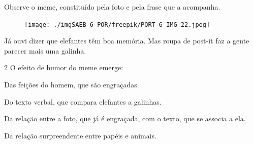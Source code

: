 


Observe o meme, constituído pela foto e pela frase que a
acompanha.\enlargethispage{2\baselineskip}

\begin{myquote}
\begin{figure}[H]
\centering\texttt{[image: ./imgSAEB\_6\_POR/freepik/PORT\_6\_IMG-22.jpeg]}
\end{figure}

Já ouvi dizer que elefantes têm boa memória. Mas roupa de post-it faz a
gente parecer mais uma galinha.
\end{myquote}

\pagebreak
\num{2} O efeito de humor do meme emerge:

\begin{escolha}
\item Das feições do homem, que são engraçadas.
\item Do texto verbal, que compara elefantes a galinhas.
\item Da relação entre a foto, que já é engraçada, com o texto, que se
associa a ela. \item Da relação surpreendente entre papéis e animais.
\end{escolha}

